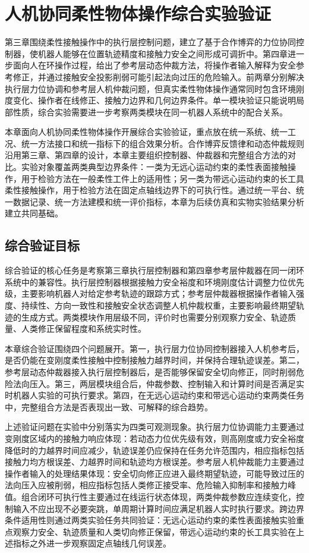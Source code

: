 \chapter{人机协同柔性物体操作综合实验验证}
\label{chap:dual_arbitration_industrial_contact}
\label{chap:ch5_integrated_validation}

第三章围绕柔性接触操作中的执行层控制问题，建立了基于合作博弈的力位协同控制器，使机器人能够在位置轨迹精度和接触力安全之间形成可调折中。第四章进一步面向人在环操作过程，给出了参考层动态仲裁方法，将操作者输入解释为安全参考修正，并通过接触安全投影削弱可能引起法向过压的危险输入。前两章分别解决执行层力位协调和参考层人机仲裁问题，但真实柔性物体操作通常同时包含环境刚度变化、操作者在线修正、接触力边界和几何边界条件。单一模块验证只能说明局部性质，综合实验需要进一步考察两类模块在同一机器人系统中的配合关系。

本章面向人机协同柔性物体操作开展综合实验验证，重点放在统一系统、统一工况、统一方法接口和统一指标下的组合效果分析。合作博弈反馈律和动态仲裁规则沿用第三章、第四章的设计，本章主要组织控制器、仲裁器和完整组合方法的对比。实验对象覆盖两类典型边界条件：一类为无远心运动约束的柔性表面接触操作，用于检验方法在一般柔性工件上的适用性；另一类为带远心运动约束的长工具柔性接触操作，用于检验方法在固定点轴线边界下的可执行性。通过统一平台、统一数据记录、统一方法建模和统一评价指标，本章为后续仿真和实物实验结果分析建立共同基础。

\section{综合验证目标}
\label{sec:ch5_validation_goal}

综合验证的核心任务是考察第三章执行层控制器和第四章参考层仲裁器在同一闭环系统中的兼容性。执行层控制器根据接触力安全裕度和环境刚度估计调整力位优先级，主要影响机器人对给定参考轨迹的跟踪方式；参考层仲裁器根据操作者输入强度、持续性、方向一致性和接触安全状态调整人机仲裁权重，主要影响最终期望轨迹的生成方式。两类模块作用层级不同，评价时也需要分别观察力安全、轨迹质量、人类修正保留程度和系统实时性。

本章综合验证围绕四个问题展开。第一，执行层力位协同控制器接入人机参考后，是否仍能在变刚度柔性接触中控制接触力越界时间，并保持合理轨迹误差。第二，参考层动态仲裁器接入执行层控制器后，是否能够保留安全切向修正，同时削弱危险法向压入。第三，两层模块组合后，仲裁参数、控制输入和计算时间是否满足实时机器人实验的可执行要求。第四，在无远心运动约束和带远心运动约束两类任务中，完整组合方法是否表现出一致、可解释的综合趋势。

上述验证问题在实验中分别落实为四类可观测现象。执行层力位协调能力主要通过变刚度区域内的接触力响应体现：若动态力位优先级有效，则高刚度或力安全裕度降低时的力越界时间应减少，轨迹误差仍应保持在任务允许范围内，相应指标包括接触力均方根误差、力越界时间和轨迹均方根误差。参考层人机仲裁能力主要通过操作者输入的处理结果体现：安全切向修正应进入最终期望轨迹，可能导致过压的法向压入应被削弱，相应指标包括人类修正接受率、危险输入抑制率和接触力峰值。组合闭环可执行性主要通过在线运行状态体现，两类仲裁参数应连续变化，控制输入不应出现不必要突跳，单周期计算时间应满足机器人实时执行要求。跨边界条件适用性则通过两类实验任务共同验证：无远心运动约束的柔性表面接触实验重点观察力安全、轨迹质量和人类切向修正保留，带远心运动约束的长工具实验在上述指标之外进一步观察固定点轴线几何误差。

